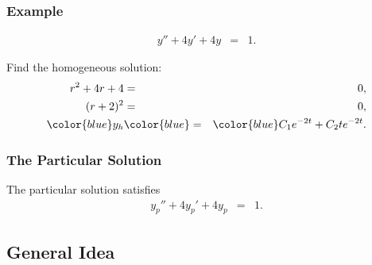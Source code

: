 \begin{frame}
  \frametitle{Example}

  \begin{eqnarray*}
    y'' + 4y' + 4y & = & 1.
  \end{eqnarray*}

  {
    Find the homogeneous solution:
      \begin{eqnarray*}
        r^2 + 4r + 4 & = & 0, \\
        (r+2)^2 & = & 0, \\
        {\color{blue}y_h} & {\color{blue}=} & {\color{blue}C_1 e^{-2t} + C_2 t e^{-2t}}.
      \end{eqnarray*}
    }

\end{frame}


\begin{frame}
  \frametitle{The Particular Solution}

  The particular solution satisfies
  \begin{eqnarray*}
    y_p'' + 4y_p' + 4y_p & = & 1.
  \end{eqnarray*}

  


\end{frame}

\subsection{General Idea}

